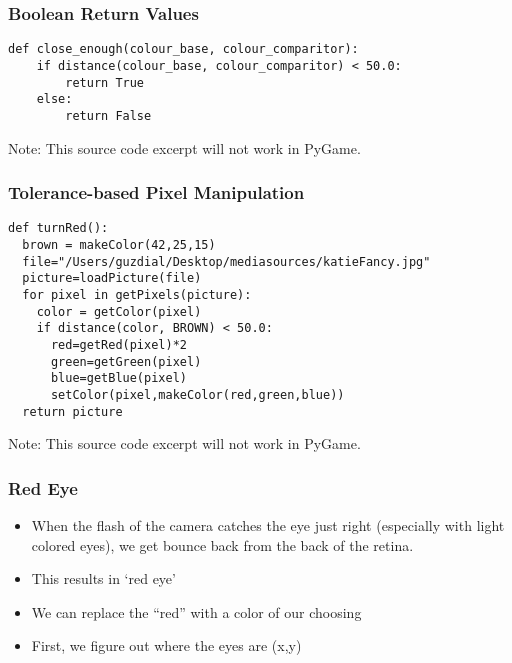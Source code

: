 \begin{frame}[fragile]
	\frametitle{Boolean Return Values}
	
\begin{lstlisting}
def close_enough(colour_base, colour_comparitor):
    if distance(colour_base, colour_comparitor) < 50.0:
        return True
    else:
        return False
\end{lstlisting}

Note: This source code excerpt will not work in PyGame.

\end{frame}

\begin{frame}[fragile]
	\frametitle{Tolerance-based Pixel Manipulation}
	
\begin{lstlisting}
def turnRed():
  brown = makeColor(42,25,15)
  file="/Users/guzdial/Desktop/mediasources/katieFancy.jpg"
  picture=loadPicture(file)
  for pixel in getPixels(picture):
    color = getColor(pixel)
    if distance(color, BROWN) < 50.0:
      red=getRed(pixel)*2
      green=getGreen(pixel)
      blue=getBlue(pixel)
      setColor(pixel,makeColor(red,green,blue))
  return picture

\end{lstlisting}

Note: This source code excerpt will not work in PyGame.

\end{frame}

\begin{frame}
	\frametitle{Red Eye}
	
	\begin{itemize}		
		\item When the flash of the camera catches the eye just right (especially with light colored eyes), we get bounce back from the back of the retina.
		\item This results in `red eye'
		\item We can replace the “red” with a color of our choosing
		\item First, we figure out where the eyes are (x,y)
	\end{itemize}
\end{frame}


